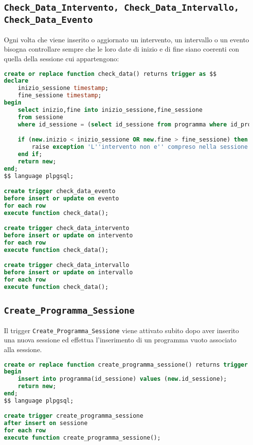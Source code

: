\subsection{\texttt{Check\_Data\_Intervento, Check\_Data\_Intervallo, Check\_Data\_Evento}}\label{trigger:check_data}
Ogni volta che viene inserito o aggiornato un intervento, un intervallo o un evento bisogna controllare sempre che le loro date di inizio e di fine siano coerenti con quella della sessione cui appartengono:
\begin{lstlisting}[caption={check\_data\_intervento},language=SQL,style=mystyle]
create or replace function check_data() returns trigger as $$
declare
    inizio_sessione timestamp;
    fine_sessione timestamp;
begin
    select inizio,fine into inizio_sessione,fine_sessione
    from sessione
    where id_sessione = (select id_sessione from programma where id_programma = new.id_programma);

    if (new.inizio < inizio_sessione OR new.fine > fine_sessione) then
        raise exception 'L''intervento non e'' compreso nella sessione';
    end if;
    return new;
end;
$$ language plpgsql;

create trigger check_data_evento
before insert or update on evento
for each row
execute function check_data();

create trigger check_data_intervento
before insert or update on intervento
for each row
execute function check_data();

create trigger check_data_intervallo
before insert or update on intervallo
for each row
execute function check_data();
\end{lstlisting}
\subsection{\texttt{Create\_Programma\_Sessione}}
Il trigger \texttt{Create\_Programma\_Sessione} viene attivato subito dopo aver inserito una nuova sessione ed effettua l'inserimento di un programma vuoto associato alla sessione.
\begin{lstlisting}[language=SQL, caption={\texttt{create\_programma\_sessione}},style=mystyle]
create or replace function create_programma_sessione() returns trigger as $$
begin
    insert into programma(id_sessione) values (new.id_sessione);
    return new;
end;
$$ language plpgsql;

create trigger create_programma_sessione
after insert on sessione
for each row
execute function create_programma_sessione();
\end{lstlisting}
